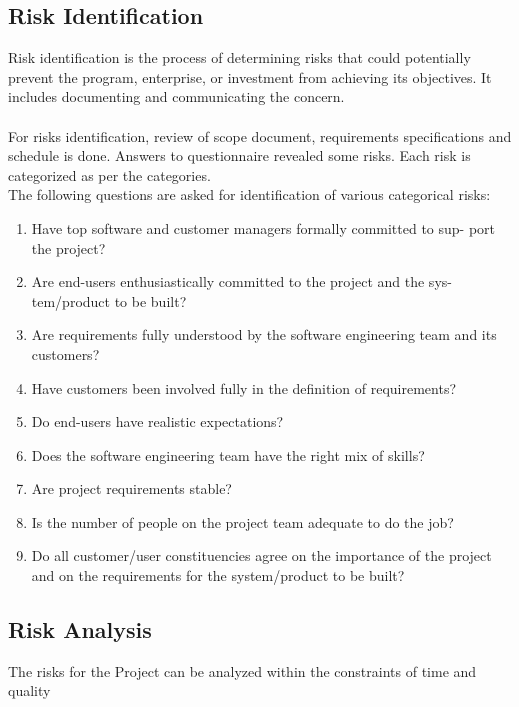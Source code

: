 \documentclass[12pt,a4paper]{report}
\begin{document}
\subsection{Risk Identification}
Risk identification is the process of determining risks that could potentially prevent the program, enterprise, or investment from achieving its objectives. It includes documenting and communicating the concern.\\\\
For risks identification, review of scope document, requirements specifications
and schedule is done. Answers to questionnaire revealed some risks. Each
risk is categorized as per the categories.\\
The following questions are asked for identification of various categorical risks:
\begin{enumerate}
	\item Have top software and customer managers formally committed to sup-
	port the project?
	\item Are end-users enthusiastically committed to the project and the sys-
	tem/product to be built?
	\item Are requirements fully understood by the software engineering team
	and its customers?
	\item Have customers been involved fully in the definition of requirements?
	\item Do end-users have realistic expectations?
	\item Does the software engineering team have the right mix of skills?
	\item Are project requirements stable?
	\item Is the number of people on the project team adequate to do the job?
	\item Do all customer/user constituencies agree on the importance of the
	project and on the requirements for the system/product to be built?
\end{enumerate}

\subsection{Risk Analysis}
The risks for the Project can be analyzed within the constraints of time and quality
\end{document}
